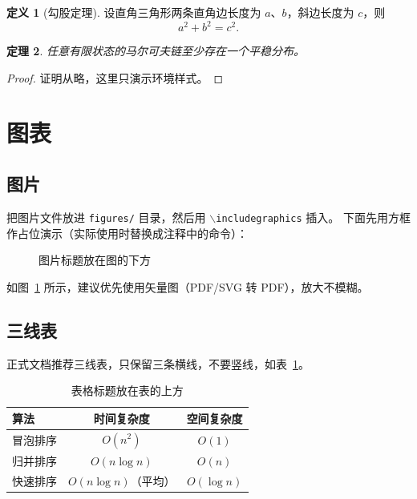 \documentclass[11pt,a4paper]{article}
\newtheorem{theorem}{定理}[section]
\theoremstyle{definition}
\newtheorem{definition}[theorem]{定义}
\theoremstyle{remark}
\begin{document}
\begin{definition}[勾股定理]
  设直角三角形两条直角边长度为 $a$、$b$，斜边长度为 $c$，则
  \begin{equation*}
    a^2 + b^2 = c^2.
  \end{equation*}
\end{definition}

\begin{theorem}
  \label{thm:example}
  任意有限状态的马尔可夫链至少存在一个平稳分布。
\end{theorem}

\begin{proof}
  证明从略，这里只演示环境样式。
\end{proof}

\section{图表}

\subsection{图片}

把图片文件放进 \texttt{figures/} 目录，然后用 \texttt{$\backslash$includegraphics} 插入。
下面先用方框作占位演示（实际使用时替换成注释中的命令）：

\begin{figure}[htbp]
  \centering
  \caption{图片标题放在图的下方}
  \label{fig:demo}
\end{figure}

如图~\ref{fig:demo} 所示，建议优先使用矢量图（PDF/SVG 转 PDF），放大不模糊。

\subsection{三线表}

正式文档推荐三线表，只保留三条横线，不要竖线，如表~\ref{tab:example}。

\begin{table}[htbp]
  \centering
  \caption{表格标题放在表的上方}
  \label{tab:example}
  \begin{tabular}{lcc}
    \toprule
    算法 & 时间复杂度 & 空间复杂度 \\
    \midrule
    冒泡排序 & $O(n^2)$ & $O(1)$ \\
    归并排序 & $O(n\log n)$ & $O(n)$ \\
    快速排序 & $O(n\log n)$（平均） & $O(\log n)$ \\
    \bottomrule
  \end{tabular}
\end{table}
\end{document}
